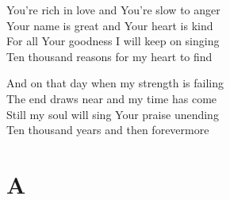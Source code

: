 \documentclass{beamer}
\begin{document}
{\begin{frame}{}
\end{frame}

\hypertarget{10,000 reasons['Bless the Lord, O my soul']2}{}
\begin{frame}{}
\fontsize{ 15 }{ 19 }\selectfont

You're rich in love and You're slow to anger\\ 
Your name is great and Your heart is kind\\ 
For all Your goodness I will keep on singing\\ 
Ten thousand reasons for my heart to find 

\end{frame}

\hypertarget{10,000 reasons['Bless the Lord, O my soul']3}{}
\begin{frame}{}
\fontsize{ 15 }{ 19 }\selectfont

And on that day when my strength is failing\\ 
The end draws near and my time has come\\ 
Still my soul will sing Your praise unending\\ 
Ten thousand years and then forevermore 

\end{frame}

}
\section{A}
\end{document}
